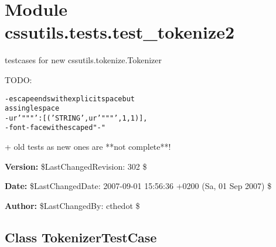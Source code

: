 %
%
%


\section{Module cssutils.tests.test\_tokenize2}

    \label{cssutils:tests:test_tokenize2}
testcases for new cssutils.tokenize.Tokenizer

TODO:

\begin{alltt}
   - escape ends with explicit space but 
as single space
   - ur'"""': [('STRING', ur'"""', 1, 1)],
   - font-face with escaped "-"\end{alltt}

+ old tests as new ones are **not complete**!

\textbf{Version:} \$LastChangedRevision: 302 \$



\textbf{Date:} \$LastChangedDate: 2007-09-01 15:56:36 +0200 (Sa, 01 Sep 2007) \$



\textbf{Author:} \$LastChangedBy: cthedot \$





\subsection{Class TokenizerTestCase}

